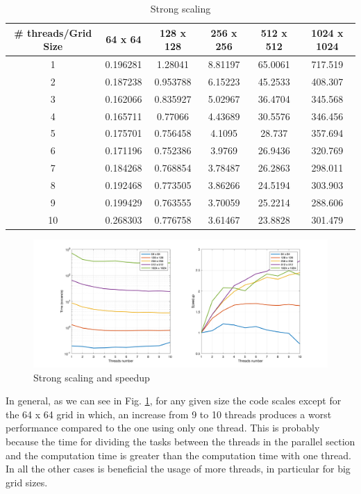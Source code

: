 \documentclass[unicode,11pt,a4paper,oneside,numbers=endperiod,openany]{scrartcl}
\begin{document}
\begin{table}[h!]
\begin{center}
	\begin{tabular}{|c|c|c|c|c|c|}
		\hline
		\textbf{\# threads/Grid Size} & 64 x 64 & 128 x 128 & 256 x 256 & 512 x 512 & 1024 x 1024\\
		\hline
		1&0.196281&1.28041&8.81197&65.0061&717.519\\
		\hline
		2&0.187238&0.953788&6.15223&45.2533&408.307\\
		\hline
		3&0.162066&0.835927&5.02967&36.4704&345.568\\
		\hline
		4&0.165711&0.77066&4.43689&30.5576&346.456\\
		\hline
		5&0.175701&0.756458&4.1095&28.737&357.694\\
		\hline
		6&0.171196&0.752386&3.9769&26.9436&320.769\\
		\hline
		7&0.184268&0.768854&3.78487&26.2863&298.011\\
		\hline
		8&0.192468&0.773505&3.86266&24.5194&303.903\\
		\hline
		9&0.199429&0.763555&3.70059&25.2214&288.606\\
		\hline
		10&0.268303&0.776758&3.61467&23.8828&301.479\\
		\hline
	\end{tabular}
\end{center}
\caption{Strong scaling}\label{tab:strongScaling}
\end{table}

\begin{figure}[h!]
\centering
\includegraphics[width=\textwidth]{Figures/strongScaling.png}
\caption{Strong scaling and speedup}\label{fig:strongScaling}
\end{figure}

In general, as we can see in Fig. \ref{fig:strongScaling}, for any given size the code scales except for the 64 x 64 grid in which, an increase from 9 to 10 threads produces a worst performance compared to the one using only one thread. This is probably because the time for dividing the tasks between the threads in the parallel section and the computation time is greater than the computation time with one thread. In all the other cases is beneficial the usage of more threads, in particular for big grid sizes.    
\end{document}
